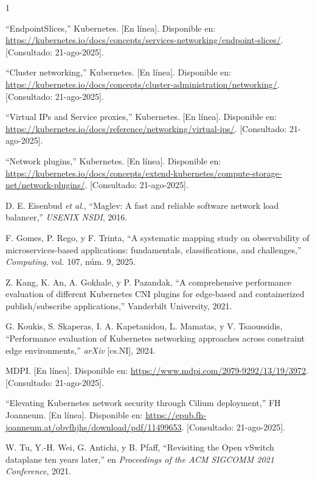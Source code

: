 \begin{thebibliography}{1}

``EndpointSlices,'' Kubernetes. [En línea]. Disponible en: \url{https://kubernetes.io/docs/concepts/services-networking/endpoint-slices/}. [Consultado: 21-ago-2025].

``Cluster networking,'' Kubernetes. [En línea]. Disponible en: \url{https://kubernetes.io/docs/concepts/cluster-administration/networking/}. [Consultado: 21-ago-2025].

``Virtual IPs and Service proxies,'' Kubernetes. [En línea]. Disponible en: \url{https://kubernetes.io/docs/reference/networking/virtual-ips/}. [Consultado: 21-ago-2025].

``Network plugins,'' Kubernetes. [En línea]. Disponible en: \url{https://kubernetes.io/docs/concepts/extend-kubernetes/compute-storage-net/network-plugins/}. [Consultado: 21-ago-2025].

D. E. Eisenbud \emph{et al.}, ``Maglev: A fast and reliable software network load balancer,'' \emph{USENIX NSDI}, 2016.

F. Gomes, P. Rego, y F. Trinta, ``A systematic mapping study on observability of microservices-based applications: fundamentals, classifications, and challenges,'' \emph{Computing}, vol. 107, núm. 9, 2025.

Z. Kang, K. An, A. Gokhale, y P. Pazandak, ``A comprehensive performance evaluation of different Kubernetes CNI plugins for edge-based and containerized publish/subscribe applications,'' Vanderbilt University, 2021.

G. Koukis, S. Skaperas, I. A. Kapetanidou, L. Mamatas, y V. Tsaoussidis, ``Performance evaluation of Kubernetes networking approaches across constraint edge environments,'' \emph{arXiv} [cs.NI], 2024.

MDPI. [En línea]. Disponible en: \url{https://www.mdpi.com/2079-9292/13/19/3972}. [Consultado: 21-ago-2025].

``Elevating Kubernetes network security through Cilium deployment,'' FH Joanneum. [En línea]. Disponible en: \url{https://epub.fh-joanneum.at/obvfhjhs/download/pdf/11499653}. [Consultado: 21-ago-2025].

W. Tu, Y.-H. Wei, G. Antichi, y B. Pfaff, ``Revisiting the Open vSwitch dataplane ten years later,'' en \emph{Proceedings of the ACM SIGCOMM 2021 Conference}, 2021.


\end{thebibliography}
